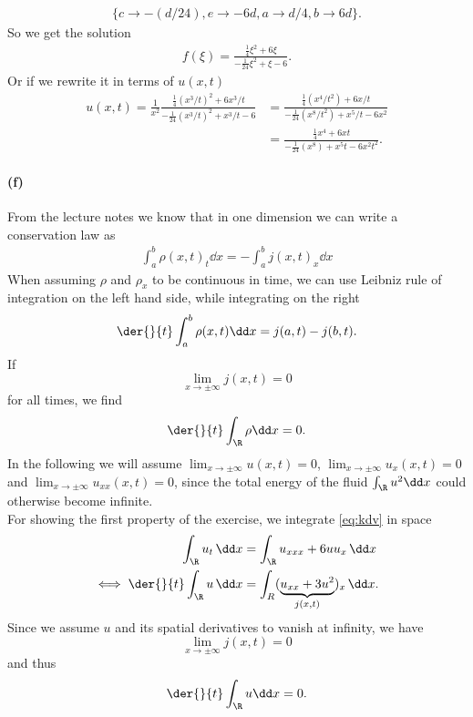 \begin{align}
\{c \rightarrow -(d/24), e \rightarrow -6 d, a \rightarrow d/4, b \rightarrow 6 d\}.
\end{align}
So we get the solution
\begin{align}
f(\xi) = \frac{\frac 14\xi^2+6\xi}{-\frac{1}{24}\xi^2+\xi-6}.
\end{align}
Or if we rewrite it in terms of $u(x,t)$
\begin{align}
u(x,t)=\frac{1}{x^2}\frac{\frac 14(x^3/t)^2+6x^3/t}{-\frac{1}{24}(x^3/t)^2+x^3/t-6} &=\frac{\frac 14(x^4/t^2)+6x/t}{-\frac{1}{24}(x^8/t^2)+x^5/t-6x^2}\\
&=\frac{\frac 14x^4+6xt}{-\frac{1}{24}(x^8)+x^5t-6x^2t^2}.
\end{align}
\paragraph{(f)}
From the lecture notes we know that in one dimension we can write a conservation law as
\begin{align}
\int_a^b\rho(x,t)_t\dd x=-\int_a^b j(x,t)_x\dd x
\end{align}
When assuming $\rho$ and $\rho_x$ to be continuous in time, we can use Leibniz rule of integration on the left hand side, while integrating on the right
\begin{align}
\der{}{t}\int_a^b\rho(x,t) \dd x= j(a,t)-j(b,t).
\end{align}
If \[\lim_{x\to\pm\infty} j (x,t)= 0\] for all times, we find
\begin{align}
\der{}{t}\int_\R \rho \dd x = 0.
\end{align}
In the following we will assume $\lim_{x\to\pm\infty}u(x,t)=0$, $\lim_{x\to\pm\infty}u_x(x,t)=0$ and $\lim_{x\to\pm\infty}u_{xx}(x,t)=0$, since the total energy of the fluid $\int_\R u^2\dd x$ could otherwise become infinite.\\
For showing the first property of the exercise, we integrate \cref{eq:kdv} in space
\begin{align}
\int_\R u_t \,\dd x&= \int_\R u_{xxx} +6uu_x\,\dd x\\
\iff \der{}{t} \int_\R u \,\dd x & = \int_R (\underbrace{u_{xx} + 3 u^2}_{j(x,t)})_x\, \dd x.
\end{align} 
Since we assume $u$ and its spatial derivatives to vanish at infinity, we have \[\lim_{x\to\pm\infty} j (x,t)= 0\] and thus
\begin{align}
\der{}{t} \int_\R u \dd x = 0.
\end{align}
